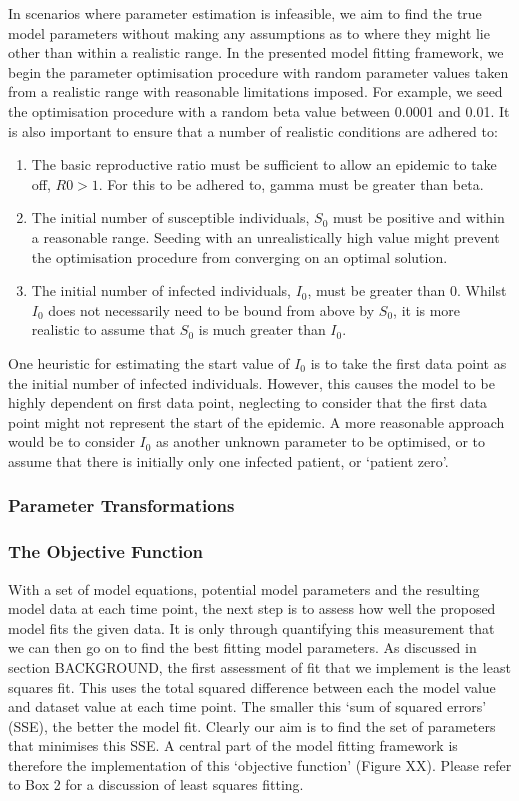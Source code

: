 \documentclass[11pt, a4paper, oneside,titlepage]{article}
\begin{document}
In scenarios where parameter estimation is infeasible, we aim to find
the true model parameters without making any assumptions as to where
they might lie other than within a realistic range. In the presented
model fitting framework, we begin the parameter optimisation procedure
with random parameter values taken from a realistic range with
reasonable limitations imposed. For example, we seed the optimisation
procedure with a random beta value between 0.0001 and 0.01. It is also
important to ensure that a number of realistic conditions are adhered
to:

\begin{enumerate}
  \item The basic reproductive ratio must be sufficient to allow an
    epidemic to take off, $R0 > 1$. For this to be adhered to, gamma
    must be greater than beta.
  \item The initial number of susceptible individuals, $S_0$ must be
    positive and within a reasonable range. Seeding with an
    unrealistically high value might prevent the optimisation
    procedure from converging on an optimal solution.
  \item The initial number of infected individuals, $I_0$, must be
    greater than 0. Whilst $I_0$ does not necessarily need to be bound
   from above by $S_0$, it is more realistic to assume that $S_0$ is
   much greater than $I_0$. 
\end{enumerate}

One heuristic for estimating the start value of $I_0$ is to take the
first data point as the initial number of infected
individuals. However, this causes the model to be highly dependent on
first data point, neglecting to consider that the first data point
might not represent the start of the epidemic. A more reasonable
approach would be to consider $I_0$ as another unknown parameter to be
optimised, or to assume that there is initially only one infected
patient, or `patient zero'.

\subsubsection{Parameter Transformations}

\subsubsection{The Objective Function}
With a set of model equations, potential model parameters and the
resulting model data at each time point, the next step is to assess
how well the proposed model fits the given data. It is only through
quantifying this measurement that we can then go on to find the best
fitting model parameters. As discussed in section BACKGROUND, the
first assessment of fit that we implement is the least squares
fit. This uses the total squared difference between each the model
value and dataset value at each time point. The smaller this `sum of
squared errors' (SSE), the better the model fit. Clearly our aim is to find
the set of parameters that minimises this SSE. A central part of the
model fitting framework is therefore the implementation of this
`objective function' (Figure XX). Please refer to Box 2
for a discussion of least squares fitting.
\end{document}
